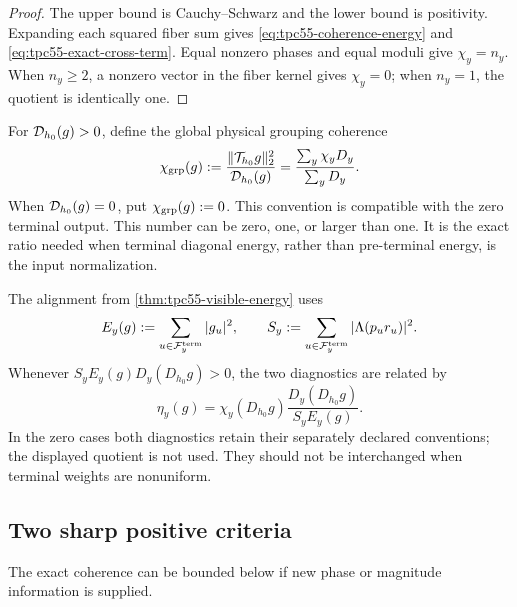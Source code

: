 \begin{proof}
The upper bound is Cauchy--Schwarz and the lower bound is positivity.
Expanding each squared fiber sum gives
\eqref{eq:tpc55-coherence-energy} and
\eqref{eq:tpc55-exact-cross-term}.  Equal nonzero phases and equal moduli
give \(\chi_y=n_y\).  When \(n_y\ge2\), a nonzero vector in the fiber
kernel gives \(\chi_y=0\); when \(n_y=1\), the quotient is identically one.
\end{proof}

For \(\mathcal D_{h_0}(g)>0\), define the global physical grouping coherence
\begin{equation}
 \chi_{\rm grp}(g)
 :=\frac{\|\mathcal T_{h_0}g\|_2^2}{\mathcal D_{h_0}(g)}
 =\frac{\sum_y\chi_yD_y}{\sum_yD_y}.
 \label{eq:tpc55-global-grouping-coherence}
\end{equation}
When \(\mathcal D_{h_0}(g)=0\), put \(\chi_{\rm grp}(g):=0\).  This convention is
compatible with the zero terminal output.
This number can be zero, one, or larger than one.  It is the exact ratio
needed when terminal diagonal energy, rather than pre-terminal energy, is
the input normalization.

The alignment from \cref{thm:tpc55-visible-energy} uses
\begin{equation}
 E_y(g):=\sum_{u\in\mathcal F_y^{\rm term}}|g_u|^2,
 \qquad
 S_y:=\sum_{u\in\mathcal F_y^{\rm term}}|\Lambda(p_ur_u)|^2.
 \label{eq:tpc55-physical-alignment-data}
\end{equation}
Whenever
\(S_yE_y(g)D_y(D_{h_0}g)>0\), the two diagnostics are related by
\begin{equation}
 \eta_y(g)
 =\chi_y(D_{h_0}g)
  \frac{D_y(D_{h_0}g)}{S_yE_y(g)}.
 \label{eq:tpc55-eta-chi-relation}
\end{equation}
In the zero cases both diagnostics retain their separately declared
conventions; the displayed quotient is not used.  They should not be
interchanged when terminal weights are nonuniform.

\subsection{Two sharp positive criteria}

The exact coherence can be bounded below if new phase or magnitude
information is supplied.

